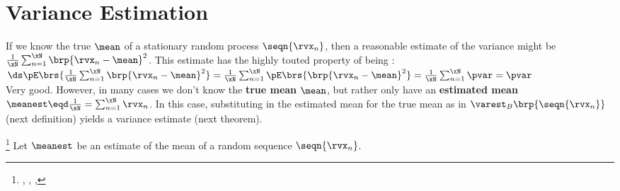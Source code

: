 \section{Variance Estimation}
If we know the true  $\mean$ of a stationary random process $\seqn{\rvx_n}$, 
then a reasonable estimate of the variance might be 
$\frac{1}{\xN}\sum_{n=1}^{\xN} \brp{\rvx_n-\mean}^2$.
This estimate has the highly touted property of being :
\\\indentx$\ds
 \pE\brs{\frac{1}{\xN}\sum_{n=1}^{\xN} \brp{\rvx_n-\mean}^2}
   =     \frac{1}{\xN}\sum_{n=1}^{\xN} \pE\brs{\brp{\rvx_n-\mean}^2}
   =     \frac{1}{\xN}\sum_{n=1}^{\xN} \pvar
   =     \pvar
$\\
Very good. 
However, in many cases we don't know the \textbf{true mean} $\mean$,
but rather only have an \textbf{estimated mean} $\meanest\eqd\frac{1}{\xN}=\sum_{n=1}^{\xN}\rvx_n$.
In this case, substituting in the estimated mean for the true mean as in 
$\varest_B\brp{\seqn{\rvx_n}}$ (next definition) yields a  variance estimate (next theorem).

\begin{definition}
\footnote{
  ,
  ,
  ,
  }
\label{def:varest}
Let $\meanest$ be an estimate of the mean of a random sequence $\seqn{\rvx_n}$.
\end{definition}

